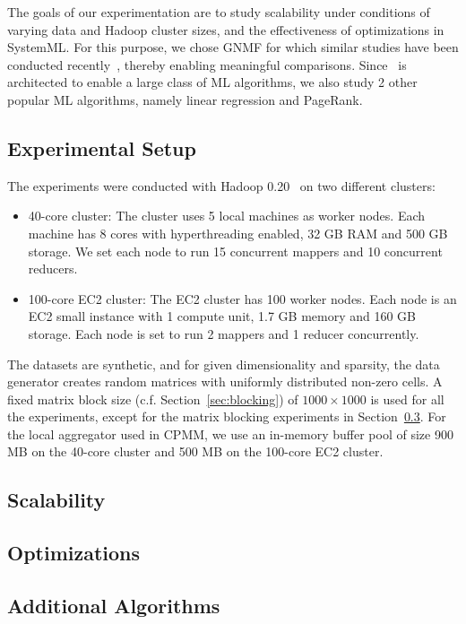 The goals of our experimentation are to study scalability under conditions of varying
data and Hadoop cluster sizes, and the effectiveness of optimizations in SystemML. For this
purpose, we chose GNMF for which similar studies have been conducted recently~\cite{msrwww10}, thereby enabling
meaningful comparisons. Since \systemmltext\ is architected to enable a large class of ML algorithms, we also study 2 other popular ML algorithms, namely linear regression and PageRank.

\subsection{Experimental Setup}\label{sec:exp-setup}

The experiments were conducted with Hadoop 0.20~\cite{hadoop} on two different clusters:
\begin{itemize}

\item{40-core cluster}: The cluster uses 5 local machines as worker nodes. Each machine has 8 cores with hyperthreading enabled, 32 GB RAM and 500 GB storage. We set each node to run 15 concurrent
  mappers and 10 concurrent reducers.

\item{100-core EC2 cluster}: The EC2 cluster has 100 worker nodes.  Each node is an EC2
  small instance with 1 compute unit, 1.7 GB memory and 160 GB storage. Each node is set to run 2
  mappers and 1 reducer concurrently.

\end{itemize}

The datasets are synthetic, and for given dimensionality and sparsity, the data generator creates
random matrices with uniformly distributed non-zero cells. A fixed matrix block size
(c.f. Section~\ref{sec:blocking}) of $1000\times 1000$ is used for all the experiments, except for
the matrix blocking experiments in Section~\ref{sec:optimizations}. For the local aggregator used in CPMM, we use an
in-memory buffer pool of size 900 MB on the 40-core cluster and 500 MB on the 100-core EC2 cluster.

\subsection{Scalability}
\label{sec:scale-expt}


\subsection{Optimizations}
\label{sec:optimizations}


\subsection{Additional Algorithms}
\label{sec:more-algs}

